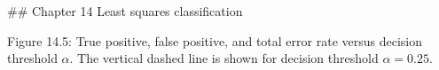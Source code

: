 

## Chapter 14 Least squares classification

Figure 14.5: True positive, false positive, and total error rate versus decision threshold \(\alpha\). The vertical dashed line is shown for decision threshold \(\alpha=0.25\).

